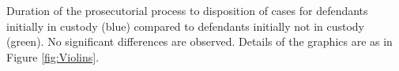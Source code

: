 Duration of the prosecutorial process to disposition of cases for defendants initially in custody (blue) compared to defendants initially not in custody (green). No significant differences are observed. Details of the graphics are as in Figure \ref{fig:Violins}.
\label{fig:ViolinsCustody}